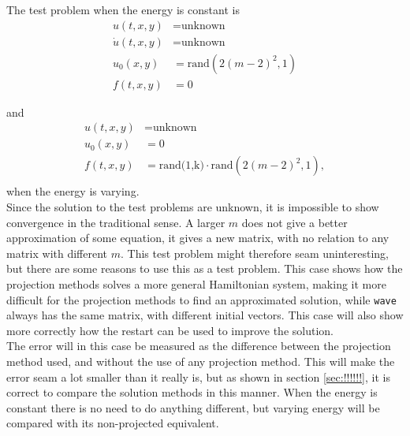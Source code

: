 The test problem when the energy is constant is 
\begin{equation}
\begin{aligned}
u(t,x,y) &= \text{unknown} \\
\dot{u}(t,x,y) &= \text{unknown} \\
u_0(x,y) &= \text{rand} (2 (m-2)^2,1) \\
f(t,x,y) &= 0
\end{aligned}
\end{equation}


and 
\begin{equation}
\begin{aligned}
u(t,x,y) &= \text{unknown} \\
u_0(x,y) &= 0 \\
f(t,x,y) &= \text{rand(1,k)} \cdot  \text{rand} (2 (m-2)^2,1), \\
\end{aligned}
\end{equation}
when the energy is varying.\\

Since the solution to the test problems are unknown, it is impossible to show convergence in the traditional sense. A larger $m$ does not give a better approximation of some equation, it gives a new matrix, with no relation to any matrix with different $m$. This test problem might therefore seam uninteresting, but there are some reasons to use this as a test problem. This case shows how the projection methods solves a more general Hamiltonian system, making it more difficult for the projection methods to find an approximated solution, while \texttt{wave} always has the same matrix, with different initial vectors. This case will also show more correctly how the restart can be used to improve the solution.  \\

The error will in this case be measured as the difference between the projection method used, and without the use of any projection method. This will make the error seam a lot smaller than it really is, but as shown in section \ref{sec:!!!!!!}, it is correct to compare the solution methods in this manner. When the energy is constant there is no need to do anything different, but varying energy will be compared with its non-projected equivalent.

